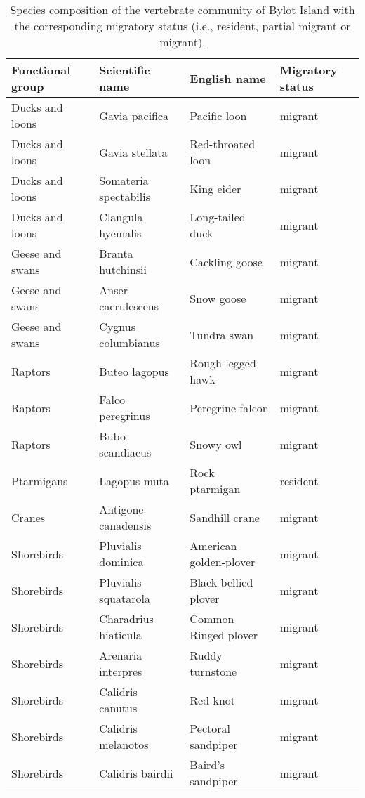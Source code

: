 \begin{table}[ht]
\centering
\caption{Species composition of the vertebrate community of Bylot Island with the corresponding migratory status (i.e., resident, partial migrant or migrant).} 
\label{table:table_species_name_strategy}
\begingroup\fontsize{10pt}{10pt}\selectfont
\begin{tabularx}{0.95\textwidth}{llll}
  \hline
Functional group & Scientific name & English name & Migratory status \\ 
  \hline
Ducks and loons  & Gavia pacifica & Pacific loon & migrant \\ 
  Ducks and loons  & Gavia stellata & Red-throated loon & migrant \\ 
  Ducks and loons  & Somateria spectabilis & King eider & migrant \\ 
  Ducks and loons  & Clangula hyemalis & Long-tailed duck & migrant \\ 
  Geese and swans  & Branta hutchinsii & Cackling goose & migrant \\ 
  Geese and swans  & Anser caerulescens & Snow goose & migrant \\ 
  Geese and swans  & Cygnus columbianus & Tundra swan & migrant \\ 
  Raptors  & Buteo lagopus & Rough-legged hawk & migrant \\ 
  Raptors  & Falco peregrinus & Peregrine falcon & migrant \\ 
  Raptors  & Bubo scandiacus & Snowy owl & migrant \\ 
  Ptarmigans  & Lagopus muta & Rock ptarmigan & resident \\ 
  Cranes  & Antigone canadensis & Sandhill crane & migrant \\ 
  Shorebirds  & Pluvialis dominica & American golden-plover & migrant \\ 
  Shorebirds  & Pluvialis squatarola & Black-bellied plover & migrant \\ 
  Shorebirds  & Charadrius hiaticula & Common Ringed plover & migrant \\ 
  Shorebirds  & Arenaria interpres & Ruddy turnstone & migrant \\ 
  Shorebirds  & Calidris canutus & Red knot & migrant \\ 
  Shorebirds  & Calidris melanotos & Pectoral sandpiper & migrant \\ 
  Shorebirds  & Calidris bairdii & Baird's sandpiper & migrant \\ 

\end{tabularx}
\end{table}
